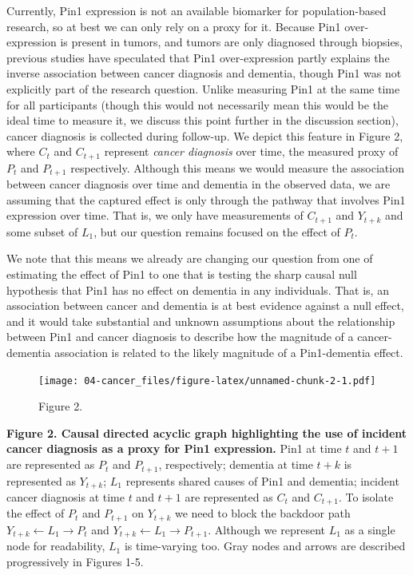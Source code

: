\documentclass[
]{book}
\begin{document}
Currently, Pin1 expression is not an available biomarker for population-based research, so at best we can only rely on a proxy for it. Because Pin1 over-expression is present in tumors, and tumors are only diagnosed through biopsies, previous studies have speculated that Pin1 over-expression partly explains the inverse association between cancer diagnosis and dementia, though Pin1 was not explicitly part of the research question\autocite{driver2012,musicco2013,freedman2016,bowles2017,frain2017,schmidt2017,sun2020,ording2020}. Unlike measuring Pin1 at the same time for all participants (though this would not necessarily mean this would be the ideal time to measure it, we discuss this point further in the discussion section), cancer diagnosis is collected during follow-up. We depict this feature in Figure 2, where \(C_t\) and \(C_{t+1}\) represent \emph{cancer diagnosis} over time, the measured proxy of \(P_{t}\) and \(P_{t+1}\) respectively. Although this means we would measure the association between cancer diagnosis over time and dementia in the observed data, we are assuming that the captured effect is only through the pathway that involves Pin1 expression over time. That is, we only have measurements of \(C_{t+1}\) and \(Y_{t+k}\) and some subset of \(L_1\), but our question remains focused on the effect of \(P_t\).

We note that this means we already are changing our question from one of estimating the effect of Pin1 to one that is testing the sharp causal null hypothesis that Pin1 has no effect on dementia in any individuals. That is, an association between cancer and dementia is at best evidence against a null effect, and it would take substantial and unknown assumptions about the relationship between Pin1 and cancer diagnosis to describe how the magnitude of a cancer-dementia association is related to the likely magnitude of a Pin1-dementia effect.

\begin{figure}
\centering
\texttt{[image: 04-cancer\_files/figure-latex/unnamed-chunk-2-1.pdf]}
\caption{\label{fig:unnamed-chunk-2}Figure 2.}
\end{figure}

\textbf{Figure 2. Causal directed acyclic graph highlighting the use of incident cancer diagnosis as a proxy for Pin1 expression.} Pin1 at time \(t\) and \(t+1\) are represented as \(P_t\) and \(P_{t+1}\), respectively; dementia at time \(t+k\) is represented as \(Y_{t+k}\); \(L_1\) represents shared causes of Pin1 and dementia; incident cancer diagnosis at time \(t\) and \(t+1\) are represented as \(C_t\) and \(C_{t+1}\). To isolate the effect of \(P_t\) and \(P_{t+1}\) on \(Y_{t+k}\) we need to block the backdoor path \(Y_{t+k} \leftarrow L_1 \rightarrow P_t\) and \(Y_{t+k} \leftarrow L_1 \rightarrow P_{t+1}\). Although we represent \(L_1\) as a single node for readability, \(L_1\) is time-varying too. Gray nodes and arrows are described progressively in Figures 1-5.
\end{document}
